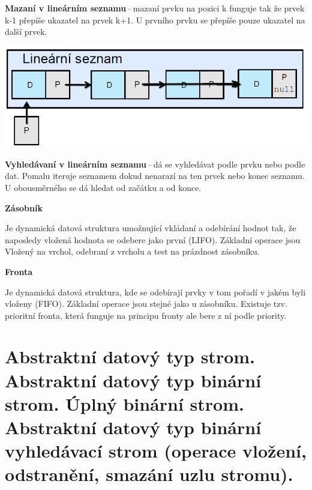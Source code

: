 \textbf{Mazaní v lineárním seznamu}\,--\,mazaní prvku na pozici k funguje tak že prvek k-1 přepíše ukazatel na prvek k+1. U prvního prvku se přepíše pouze ukazatel na další prvek.
\begin{center}
\includegraphics[scale=0.5]{BPC-TIN/images/sezdel.PNG}
\end{center}

\textbf{Vyhledávaní v lineárním seznamu}\,--\,dá se vyhledávat podle prvku nebo podle dat. Pomalu iteruje seznamem dokud nenarazí na ten prvek nebo konec seznamu. U obousměrného se dá hledat od začátku a od konce.

\begin{Large}\vspace{0,5cm} \textbf{Zásobník}
\end{Large}

Je dynamická datová struktura umožnující vkládaní a odebírání hodnot tak, že naposledy vložená hodnota se odebere jako první (LIFO). Základní operace jsou Vložený na vrchol, odebraní z vrcholu a test na prázdnost zásobníku. 

\begin{Large}\vspace{0,5cm} \textbf{Fronta}
\end{Large}

Je dynamická datová struktura, kde se odebírají prvky v tom pořadí v jakém byli vloženy (FIFO). Základní operace jsou stejné jako u zásobníku. Existuje tzv. prioritní fronta, která funguje na principu fronty ale bere z ní podle priority.








\newpage
\section{Abstraktní datový typ strom. Abstraktní datový typ binární strom. Úplný binární strom. Abstraktní datový typ binární vyhledávací strom (operace vložení, odstranění, smazání uzlu stromu).}

